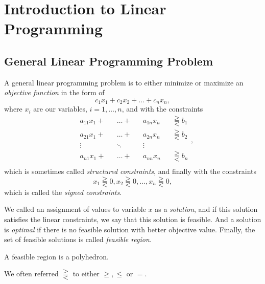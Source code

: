 \chapter{Introduction to Linear Programming}
\section{General Linear Programming Problem}
A general linear programming problem is to either minimize or maximize an \emph{objective function} in the form of
\[
	c_1 x_1 + c_2 x_2 + \ldots +c_n x_n,
\]
where \(x_{i}\) are our variables, \(i = 1, \ldots, n\), and with the constraints
\[
	\begin{alignedat}{4}
		&a_{11} x_1 + &&\ldots + &&a_{1n}x_n &&\gtreqqless b_1\\
		&a_{21} x_1 + &&\ldots + &&a_{2n}x_n &&\gtreqqless b_2\\
		&\vdots &&\ddots &&\vdots && \\
		&a_{n1} x_1 + &&\ldots + &&a_{nn}x_n &&\gtreqqless b_n\\
	\end{alignedat},
\]
which is sometimes called \emph{structured constraints}, and finally with the constraints
\[
	x_1 \gtreqqless 0, x_2\gtreqqless 0, \ldots ,x_n\gtreqqless 0,
\]
which is called the \emph{signed constraints}.

We called an assignment of values to variable \(x\) as a \emph{solution}, and if this solution satisfies the linear constraints, we say that
this solution is feasible. And a solution is \emph{optimal} if there is no feasible solution with better objective value. Finally, the set of feasible
solutions is called \emph{feasible region.}

\begin{remark}
	A feasible region is a polyhedron.
\end{remark}


\begin{notation}
	We often referred \(\gtreqqless \) to either \(\geq , \leq\) or \(=\).
\end{notation}

